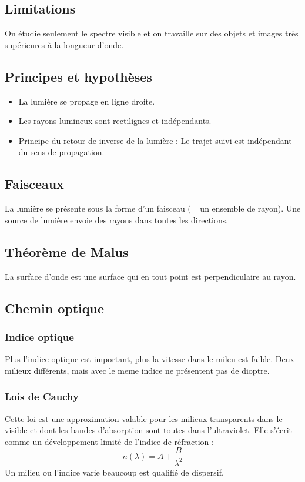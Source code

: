 \documentclass[french]{yLectureNote}
\begin{document}
\subsection{Limitations}

On étudie seulement le spectre visible et on travaille sur des objets et images très supérieures à la longueur d'onde.
	\subsection{Principes et hypothèses}
	\begin{itemize}
	 \item La lumière se propage en ligne droite.
	 \item Les rayons lumineux sont rectilignes et indépendants.
	 \item Principe du retour de inverse de la lumière : Le trajet suivi est indépendant du sens de propagation.
	\end{itemize}
	\subsection{Faisceaux}
	La lumière se présente sous la forme d'un faisceau (= un ensemble de rayon). Une source de lumière envoie des rayons dans toutes les directions.
	\subsection{Théorème de Malus}
\begin{theorem}
 	La surface d'onde est une surface qui en tout point est perpendiculaire au rayon.
\end{theorem}
	\subsection{Chemin optique}
	\subsubsection{Indice optique}
Plus l'indice optique est important, plus la vitesse dans le mileu est faible.
Deux milieux différents, mais avec le meme indice ne présentent pas de dioptre.

\subsubsection{Lois de Cauchy}
Cette loi est une approximation valable pour les milieux transparents dans le visible et dont les bandes d'absorption sont toutes dans l'ultraviolet. Elle s'écrit comme un développement limité de l'indice de réfraction :  \[n(\lambda) = A + \frac{B}{\lambda^2}\]
	Un milieu ou l'indice varie beaucoup est qualifié de dispersif.
\end{document}
